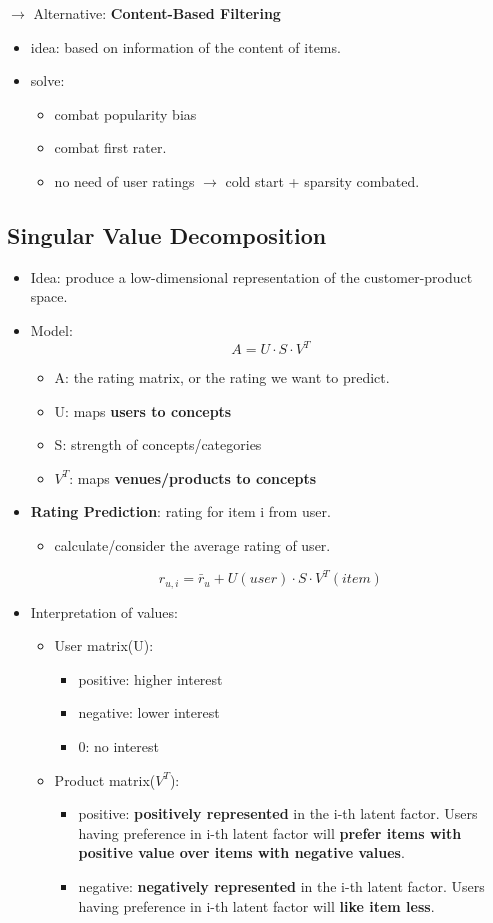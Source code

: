 $\rightarrow$ Alternative: \textbf{Content-Based Filtering}
\begin{itemize}
	\item idea: based on information of the content of items.
	\item solve: 
	\begin{itemize}
		\item combat popularity bias
		\item combat first rater.
		\item no need of user ratings $\rightarrow$ cold start + sparsity combated.
	\end{itemize}
\end{itemize}

\subsection{Singular Value Decomposition}
\begin{itemize}
	\item Idea: produce a low-dimensional representation of the customer-product space.
	\item Model:
	$$A = U \cdot S \cdot V^T$$
	\begin{itemize}
		\item A: the rating matrix, or the rating we want to predict.
		\item U: maps \textbf{users to concepts}
		\item S: strength of concepts/categories
		\item $V^T$: maps \textbf{venues/products to concepts} 
	\end{itemize}
	\item \textbf{Rating Prediction}: rating for item i from user.
	\begin{itemize}
		\item calculate/consider the average rating of user.
	\end{itemize}
	$$r_{u,i} = \bar{r}_u + U(user) \cdot S \cdot V^T(item)$$
	
	\item Interpretation of values:
	\begin{itemize}
		\item User matrix(U):
		\begin{itemize}
			\item positive: higher interest
			\item negative: lower interest
			\item 0: no interest
		\end{itemize}
		\item Product matrix($V^T$):
		\begin{itemize}
			\item positive: \textbf{positively represented} in the i-th latent factor. Users having preference in i-th latent factor will \textbf{prefer items with positive value over items with negative values}.
			\item negative: \textbf{negatively represented} in the i-th latent factor. Users having preference in i-th latent factor will \textbf{like item less}.
		\end{itemize}
	\end{itemize}
\end{itemize}
